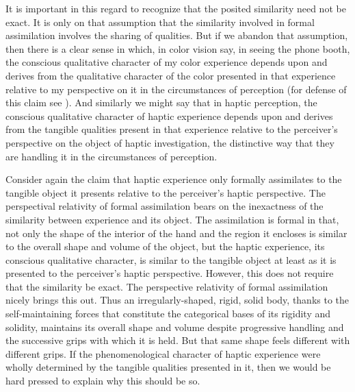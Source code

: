 It is important in this regard to recognize that the posited similarity need not be exact. It is only on that assumption that the similarity involved in formal assimilation involves the sharing of qualities. But if we abandon that assumption, then there is a clear sense in which, in color vision say, in seeing the phone booth, the conscious qualitative character of my color experience depends upon and derives from the qualitative character of the color presented in that experience relative to my perspective on it in the circumstances of perception (for defense of this claim see \citealt{Kalderon:2008fk,Kalderon:2007mr,Kalderon:2011fk}). And similarly we might say that in haptic perception, the conscious qualitative character of haptic experience depends upon and derives from the tangible qualities present in that experience relative to the perceiver's perspective on the object of haptic investigation, the distinctive way that they are handling it in the circumstances of perception. 

Consider again the claim that haptic experience only formally assimilates to the tangible object it presents relative to the perceiver's haptic perspective. The perspectival relativity of formal assimilation bears on the inexactness of the similarity between experience and its object. The assimilation is formal in that, not only the shape of the interior of the hand and the region it encloses is similar to the overall shape and volume of the object, but the haptic experience, its conscious qualitative character, is similar to the tangible object at least as it is presented to the perceiver's haptic perspective. However, this does not require that the similarity be exact. The perspective relativity of formal assimilation nicely brings this out. Thus an irregularly-shaped, rigid, solid body, thanks to the self-maintaining forces that constitute the categorical bases of its rigidity and solidity, maintains its overall shape and volume despite progressive handling and the successive grips with which it is held. But that same shape feels different with different grips. If the phenomenological character of haptic experience were wholly determined by the tangible qualities presented in it, then we would be hard pressed to explain why this should be so. 


